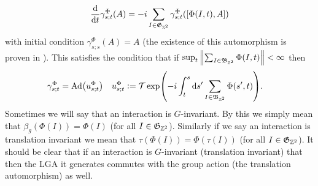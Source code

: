 \documentclass[11pt,a4paper,twoside]{article}
\numberwithin{equation}{section}
\begin{document}
\begin{equation}
	\frac{\text{d}}{\text{d} t}\gamma^{\Phi}_{s;t}(A)=-i\sum_{I\in\mathfrak{G}_{\mathbb Z^2}}\gamma^{\Phi}_{s;t}([\Phi(I,t),A])
\end{equation}
with initial condition $\gamma^{\Phi}_{s;s}(A)=A$ (the existence of this automorphism is proven in \cite{doi:10.1063/1.5095769}). This satisfies the condition that if $\sup_t\norm{\sum_{I\in\mathfrak{B}_{\mathbb Z^2}}\Phi(I,t)}<\infty$ then
\begin{align}
	\gamma^\Phi_{s;t}&=\Ad{u^\Phi_{s;t}}&u^\Phi_{s;t}&\defeq\mathcal{T}\exp(-i\int_t^s\d s'\sum_{I\in\mathfrak{B}_{\ZZ^2}}\Phi(s',t)).
\end{align}
Sometimes we will say that an interaction is $G$-invariant. By this we simply mean that $\beta_g(\Phi(I))=\Phi(I)$ (for all $I\in\mathfrak{G}_{\mathbb Z^2}$). Similarly if we say an interaction is translation invariant we mean that $\tau(\Phi(I))=\Phi(\tau(I))$ (for all $I\in\mathfrak{G}_{\mathbb Z^2}$). It should be clear that if an interaction is $G$-invariant (translation invariant) that then the LGA it generates commutes with the group action (the translation automorphism) as well.
\end{document}
